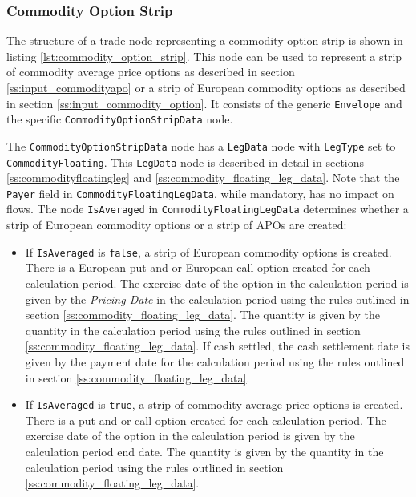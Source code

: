 \usepackage{listings}\subsubsection{Commodity Option Strip}
\label{ss:commodityoptionstrip}

The structure of a trade node representing a commodity option strip is shown in listing \ref{lst:commodity_option_strip}. This node can be used to represent a strip of commodity average price options as described in section \ref{ss:input_commodityapo} or a strip of European commodity options as described in section \ref{ss:input_commodity_option}. It consists of the generic \lstinline!Envelope! and the specific \lstinline!CommodityOptionStripData! node.

The \lstinline!CommodityOptionStripData! node has a \lstinline!LegData! node with \lstinline!LegType! set to \lstinline!CommodityFloating!. This \lstinline!LegData! node is described in detail in sections \ref{ss:commodityfloatingleg} and \ref{ss:commodity_floating_leg_data}. Note that the  \lstinline!Payer! field in \lstinline!CommodityFloatingLegData!, while mandatory, has no impact on flows. The node \lstinline!IsAveraged! in \lstinline!CommodityFloatingLegData! determines whether a strip of European commodity options or a strip of APOs are created:

\begin{itemize}

\item
If \lstinline!IsAveraged! is \lstinline!false!, a strip of European commodity options is created. There is a European put and or European call option created for each calculation period. The exercise date of the option in the calculation period is given by the \textit{Pricing Date} in the calculation period using the rules outlined in section \ref{ss:commodity_floating_leg_data}. The quantity is given by the quantity in the calculation period using the rules outlined in section \ref{ss:commodity_floating_leg_data}. If cash settled, the cash settlement date is given by the payment date for the calculation period using the rules outlined in section \ref{ss:commodity_floating_leg_data}.

\item
If \lstinline!IsAveraged! is \lstinline!true!, a strip of commodity average price options is created. There is a put and or call option created for each calculation period. The exercise date of the option in the calculation period is given by the calculation period end date. The quantity is given by the quantity in the calculation period using the rules outlined in section \ref{ss:commodity_floating_leg_data}.

\end{itemize}

